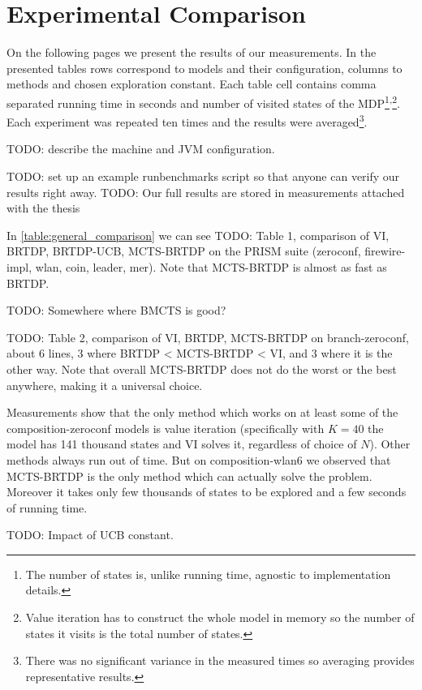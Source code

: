 \section{Experimental Comparison}

On the following pages we present the results of our measurements.
In the presented tables rows correspond to models and their
configuration, columns to methods and chosen exploration constant.  Each
table cell contains comma separated running time in seconds and number of visited
states of the MDP\footnote{The number of states is, unlike running time,
agnostic to implementation details.}\textsuperscript{,}\footnote{Value iteration has to construct the
whole model in memory so the number of states it visits is the total
number of states.}. Each experiment was repeated
ten times and the results were averaged\footnote{There was no
significant variance in the measured times so averaging provides
representative results.}.

TODO: describe the machine and JVM configuration.

TODO: set up an example
runbenchmarks script so that anyone can verify our results right away.
TODO: Our full results are stored in measurements attached with the thesis

In \autoref{table:general_comparison} we can see
TODO: Table 1, comparison of VI, BRTDP, BRTDP-UCB, MCTS-BRTDP on the
PRISM suite (zeroconf, firewire-impl, wlan, coin, leader, mer).
Note that MCTS-BRTDP is almost as fast as BRTDP.

TODO: Somewhere where BMCTS is good?

TODO: Table 2, comparison of VI, BRTDP, MCTS-BRTDP on branch-zeroconf,
about 6 lines, 3 where BRTDP < MCTS-BRTDP < VI, and 3 where it is the
other way.
Note that overall MCTS-BRTDP does
not do the worst or the best anywhere, making it a universal choice.

Measurements show that the only method which works on at least some of the
composition-zeroconf models is value iteration (specifically with $K = 40$ the
model has 141 thousand states and VI solves it, regardless of choice of $N$).
Other methods always run out of time.
But on composition-wlan6 we observed that MCTS-BRTDP is the only method which
can actually solve the problem. Moreover it takes only few thousands of states
to be explored and a few seconds of running time.

TODO: Impact of UCB constant.

